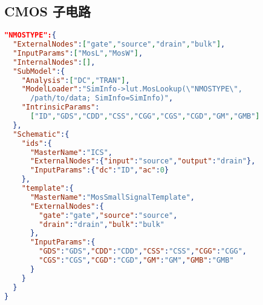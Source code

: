 \subsection{CMOS 子电路}\label{appendix:mos-subckt}
\begin{lstlisting}[language=json,numbers=none,
caption={CMOS 子电路},label=lst:mos-subckt]
"NMOSTYPE":{
  "ExternalNodes":["gate","source","drain","bulk"],
  "InputParams":["MosL","MosW"],
  "InternalNodes":[],
  "SubModel":{
    "Analysis":["DC","TRAN"],
    "ModelLoader":"SimInfo->lut.MosLookup(\"NMOSTYPE\",
      /path/to/data; SimInfo=SimInfo)",
    "IntrinsicParams":
      ["ID","GDS","CDD","CSS","CGG","CGS","CGD","GM","GMB"]
  },
  "Schematic":{
    "ids":{
      "MasterName":"ICS",
      "ExternalNodes":{"input":"source","output":"drain"},
      "InputParams":{"dc":"ID","ac":0}
    },
    "template":{
      "MasterName":"MosSmallSignalTemplate",
      "ExternalNodes":{
        "gate":"gate","source":"source",
        "drain":"drain","bulk":"bulk"
      },
      "InputParams":{
        "GDS":"GDS","CDD":"CDD","CSS":"CSS","CGG":"CGG",
        "CGS":"CGS","CGD":"CGD","GM":"GM","GMB":"GMB"
      }
    }
  }
}
\end{lstlisting}
